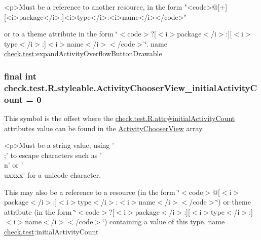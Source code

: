 \begin{DoxyVerb}      <p>Must be a reference to another resource, in the form "<code>@[+][<i>package</i>:]<i>type</i>:<i>name</i></code>"
\end{DoxyVerb}
 or to a theme attribute in the form \char`\"{}$<$code$>$?\mbox{[}$<$i$>$package$<$/i$>$\+:\mbox{]}\mbox{[}$<$i$>$type$<$/i$>$\+:\mbox{]}$<$i$>$name$<$/i$>$$<$/code$>$\char`\"{}.  name \hyperlink{namespacecheck_1_1test}{check.\+test}\+:expand\+Activity\+Overflow\+Button\+Drawable \hypertarget{classcheck_1_1test_1_1_r_1_1styleable_a121ad1bfa72c91eb832d3f651be3caf8}{}
\subsubsection[{Activity\+Chooser\+View\+\_\+initial\+Activity\+Count}]{\setlength{\rightskip}{0pt plus 5cm}final int check.\+test.\+R.\+styleable.\+Activity\+Chooser\+View\+\_\+initial\+Activity\+Count = 0\hspace{0.3cm}{\ttfamily [static]}}\label{classcheck_1_1test_1_1_r_1_1styleable_a121ad1bfa72c91eb832d3f651be3caf8}
This symbol is the offset where the \hyperlink{classcheck_1_1test_1_1_r_1_1attr_ae07c86d286d5a2d111131c1aec5f6c98}{check.\+test.\+R.\+attr\#initial\+Activity\+Count} attribute\textquotesingle{}s value can be found in the \hyperlink{classcheck_1_1test_1_1_r_1_1styleable_af1c3794ed9efe3a08ba4e2366f7961d3}{Activity\+Chooser\+View} array.

\begin{DoxyVerb}      <p>Must be a string value, using '\\;' to escape characters such as '\\n' or '\\uxxxx' for a unicode character.
\end{DoxyVerb}
 

This may also be a reference to a resource (in the form \char`\"{}$<$code$>$@\mbox{[}$<$i$>$package$<$/i$>$\+:\mbox{]}$<$i$>$type$<$/i$>$\+:$<$i$>$name$<$/i$>$$<$/code$>$\char`\"{}) or theme attribute (in the form \char`\"{}$<$code$>$?\mbox{[}$<$i$>$package$<$/i$>$\+:\mbox{]}\mbox{[}$<$i$>$type$<$/i$>$\+:\mbox{]}$<$i$>$name$<$/i$>$$<$/code$>$\char`\"{}) containing a value of this type.  name \hyperlink{namespacecheck_1_1test}{check.\+test}\+:initial\+Activity\+Count \hypertarget{classcheck_1_1test_1_1_r_1_1styleable_a1d9c160813dfdd546911e783935ebb65}{}
